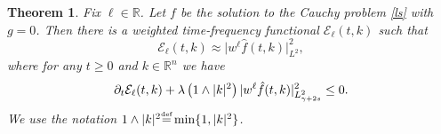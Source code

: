 \documentclass{amsart}
\newtheorem{theorem}{Theorem}[section]
\numberwithin{equation}{section}
\begin{document}
\begin{theorem}\label{thm.tfli}
Fix ${\ell}\in {\mathbb{R}}$.
Let ${f}$ be the solution to the Cauchy problem \eqref{ls}
with $g=0$. Then there is a weighted time-frequency functional ${\mathcal{E}}_{\ell}(t,k)$
such that
\begin{equation}\label{thm.tfli.1}
    {\mathcal{E}}_{\ell}(t,k) \approx {|} w^\ell \hat{f}(t,k){|}_{L^2}^2,
\end{equation}
where for any $t\geq 0$ and $k\in {{\mathbb R}^{n}}$ we have 
\begin{equation}\label{thm.tfli.2}
{\displaystyle}{\partial}_t {\mathcal{E}}_{\ell} (t,k)+{\lambda} \left( 1 \wedge |k|^2\right) {|} w^{\ell}  \hat{f}(t,k){|}_{L^2_{\gamma+2s}}^2
\le 0.
\end{equation}
We use the notation $1 \wedge |k|^2 {\overset{\mbox{\tiny{def}}}{=}}\min\{1,|k|^2\}$.
\end{theorem}
\end{document}
